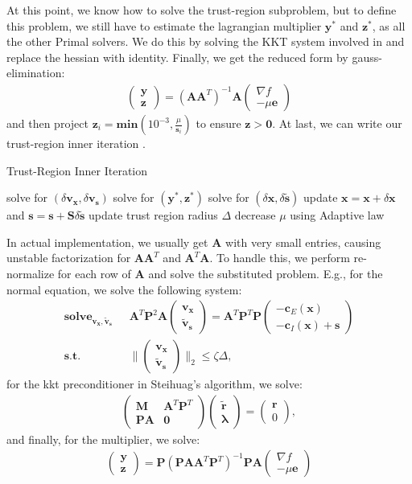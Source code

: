 \documentclass[annual]{acmsiggraph}
\newcommand{\E}[1]{\mathbf{#1}}
\newcommand{\TWOC}[2]{\left(\begin{array}{c}#1 \\ #2\end{array}\right)}
\newcommand{\MTT}[4]{\left(\begin{array}{cc}#1 & #2 \\ #3 & #4\end{array}\right)}
\begin{document}
At this point, we know how to solve the trust-region subproblem, but to define this problem, we still have to estimate the lagrangian multiplier $\E{y}^*$ and $\E{z}^*$, as all the other Primal solvers. We do this by solving the KKT system involved in  and replace the hessian with identity. Finally, we get the reduced form by gauss-elimination:
\begin{eqnarray}
\label{pb:LAG}
\TWOC{\E{y}}{\E{z}}=(\E{A}\E{A}^T)^{-1}\E{A}\TWOC{\nabla f}{-\mu \E{e}}
\end{eqnarray}
and then project $\E{z}_i=\E{min}(10^{-3},\frac{\mu}{\E{s}_i})$ to ensure $\E{z}>\E{0}$. At last, we can write our trust-region inner iteration .
\begin{algorithm}[h]
\caption{Trust-Region Inner Iteration}
\label{alg:INNER_ITER}
\begin{algorithmic}
\STATE solve  for $(\delta\E{v}_\E{x}, \delta\E{v}_\E{s})$
\STATE solve  for $(\E{y}^*, \E{z}^*)$
\STATE solve  for $(\delta\E{x}, \delta\tilde{\E{s}})$
\STATE update $\E{x}=\E{x}+\delta\E{x}$ and $\E{s}=\E{s}+\E{S}\delta\tilde{\E{s}}$
\STATE update trust region radius $\Delta$
\STATE decrease $\mu$ using Adaptive law
\ENDWHILE
\end{algorithmic}
\end{algorithm}

In actual implementation, we usually get $\E{A}$ with very small entries, causing unstable factorization for $\E{A}\E{A}^T$ and $\E{A}^T\E{A}$. To handle this, we perform re-normalize for each row of $\E{A}$ and solve the substituted problem. E.g., for the normal equation, we solve the following system:
\begin{eqnarray*}
\E{solve}_{\E{v}_\E{x}, \tilde{\E{v}}_\E{s}}\text{ }&\E{A}^T\E{P}^2\E{A}\TWOC{\E{v}_\E{x}}{\tilde{\E{v}}_\E{s}}=\E{A}^T\E{P}^T\E{P}\TWOC{-\E{c}_E(\E{x})}{-\E{c}_I(\E{x})+\E{s}}	\\
\E{s.t.}\text{ }&\|\TWOC{\E{v}_\E{x}}{\tilde{\E{v}}_\E{s}}\|_2\leq\zeta\Delta,
\end{eqnarray*}
for the kkt preconditioner in Steihuag's algorithm, we solve:
\begin{eqnarray*}
\MTT{\E{M}}{\E{A}^T\E{P}^T}{\E{P}\E{A}}{\E{0}}\TWOC{\tilde{\E{r}}}{\E{\lambda}}=\TWOC{\E{r}}{0},
\end{eqnarray*}
and finally, for the multiplier, we solve:
\begin{eqnarray*}
\TWOC{\E{y}}{\E{z}}=\E{P}(\E{P}\E{A}\E{A}^T\E{P}^T)^{-1}\E{P}\E{A}\TWOC{\nabla f}{-\mu \E{e}}
\end{eqnarray*}
\end{document}
